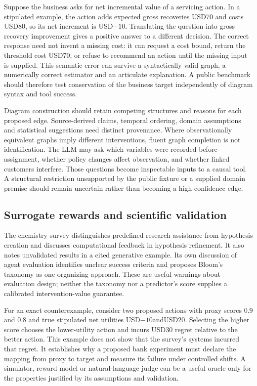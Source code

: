 Suppose the business asks for net incremental value of a servicing action. In a stipulated example, the action adds expected gross recoveries USD70 and costs USD80, so its net increment is USD$-10$. Translating the question into gross recovery improvement gives a positive answer to a different decision. The correct response need not invent a missing cost: it can request a cost bound, return the threshold cost USD70, or refuse to recommend an action until the missing input is supplied. This semantic error can survive a syntactically valid graph, a numerically correct estimator and an articulate explanation. A public benchmark should therefore test conservation of the business target independently of diagram syntax and tool success.\citep{exec25_cow_reference}

Diagram construction should retain competing structures and reasons for each proposed edge. Source-derived claims, temporal ordering, domain assumptions and statistical suggestions need distinct provenance. Where observationally equivalent graphs imply different interventions, fluent graph completion is not identification. The LLM may ask which variables were recorded before assignment, whether policy changes affect observation, and whether linked customers interfere. Those questions become inspectable inputs to a causal tool. A structural restriction unsupported by the public fixture or a supplied domain premise should remain uncertain rather than becoming a high-confidence edge.\citep{exec25_cow_reference}

\subsection{Surrogate rewards and scientific validation}

The chemistry survey distinguishes predefined research assistance from hypothesis creation and discusses computational feedback in hypothesis refinement. It also notes unvalidated results in a cited generative example. Its own discussion of agent evaluation identifies unclear success criteria and proposes Bloom's taxonomy as one organizing approach. These are useful warnings about evaluation design; neither the taxonomy nor a predictor's score supplies a calibrated intervention-value guarantee.\citep{exec25_cow_chemistry}

For an exact counterexample, consider two proposed actions with proxy scores 0.9 and 0.8 and true stipulated net utilities USD$-10$andUSD20. Selecting the higher score chooses the lower-utility action and incurs USD30 regret relative to the better action. This example does not show that the survey's systems incurred that regret. It establishes why a proposed bank experiment must declare the mapping from proxy to target and measure its failure under controlled shifts. A simulator, reward model or natural-language judge can be a useful oracle only for the properties justified by its assumptions and validation.\citep{exec25_cow_reference}

